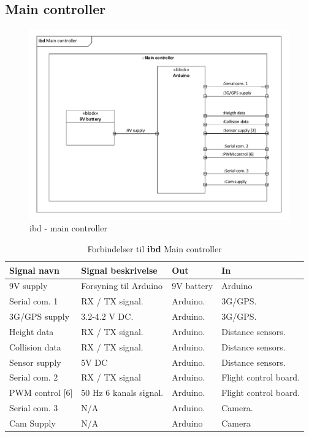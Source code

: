 \subsection{Main controller}

\begin{figure}[H]
\centering
\includegraphics[width=1\textwidth]{Billeder/IBD/ibd3_maincontroller.pdf}
\caption{ibd - main controller}
\label{fig:ibd_maincontroller}
\end{figure}

\begin{table}[H]
	\centering
		\begin{tabular}{|p{2.5 cm}|p{5.5 cm}|p{2.5 cm}|p{2.5 cm}|} 
		\hline
			\textbf{Signal navn} 	& \textbf{Signal beskrivelse}		& \textbf{Out} 				& \textbf{In}     \\ \hline
			9V supply & Forsyning til Arduino & 9V battery & Arduino 		    \\ \hline
			Serial com. 1 & RX / TX signal. & Arduino. & 3G/GPS. \\ \hline
			3G/GPS supply & 3.2-4.2 V DC. & Arduino.	& 3G/GPS.	\\ \hline
			Height data & RX / TX signal. & Arduino. & Distance sensors.			    \\ \hline
			Collision data & RX / TX signal. & Arduino. & Distance sensors.			\\ \hline
			Sensor supply & 5V DC & Arduino. & Distance sensors. \\ \hline 
			Serial com. 2 & RX / TX signal & Arduino. & Flight control board. \\ \hline 
			PWM control [6] & 50 Hz 6 kanals signal. & Arduino. & Flight control board. \\ \hline 
			Serial com. 3 & N/A & Arduino. & Camera. \\ \hline 
			Cam Supply & N/A & Arduino & Camera \\ \hline  
		\end{tabular}
	\caption{Forbindelser til \textbf{ibd} Main controller}
	\label{tab:IBDMaincontroller}
\end{table}

